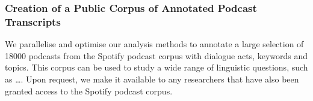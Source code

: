\subsubsection{Creation of a Public Corpus of Annotated Podcast Transcripts}
    We parallelise and optimise our analysis methods to annotate a large selection of 18000 podcasts from the Spotify podcast corpus\cite{clifton-2020100000} with dialogue acts, keywords and topics. This corpus can be used to study a wide range of linguistic questions, such as \dots. Upon request, we make it available to any researchers that have also been granted access to the Spotify podcast corpus.
\glsresetall

\newpage